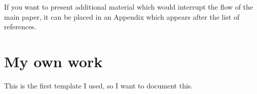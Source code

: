 \documentclass[a4paper,fleqn,usenatbib]{mnras}
\begin{document}
If you want to present additional material which would interrupt the
flow of the main paper, it can be placed in an Appendix which appears
after the list of references.

\hypertarget{my-own-work}{%
\section{My own work}\label{my-own-work}}

This is the first template I used, so I want to document this.



\bsp	%
\label{lastpage}
\end{document}
